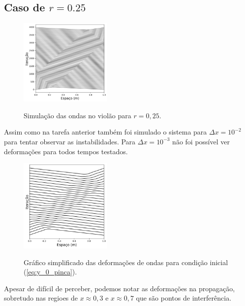 \documentclass[a4paper, 11pt]{article}
\begin{document}
\clearpage
\subsection{Caso de \( r = 0.25 \) }

\begin{figure}[h!] 
    \centering
    \caption{Simulação das ondas no violão para \( r = 0,25 \). }
    \includegraphics[width=0.4\textwidth]{graf-tarefa2-c1}
    \label{fig:tarefa2_c1}
\end{figure}

Assim como na tarefa anterior também foi simulado o sistema para \( \Delta x = 10^{-2} \) para tentar
observar as instabilidades. Para \( \Delta x = 10^{-3} \) não foi possível ver deformações para todos
tempos testados.
\begin{figure}[h!] 
    \centering
    \caption{Gráfico simplificado das deformações de ondas para condição inicial (\ref{eq:y_0_pinca}).}
    \includegraphics[width=0.4\textwidth]{graf-tarefa2-c22}
    \label{fig:tarefa2_c}
\end{figure}

Apesar de difícil de perceber, podemos notar as deformações na propagação, sobretudo nas regioes de
\( x \approx 0,3 \) e \( x \approx 0,7\) que são pontos de interferência.
\end{document}
